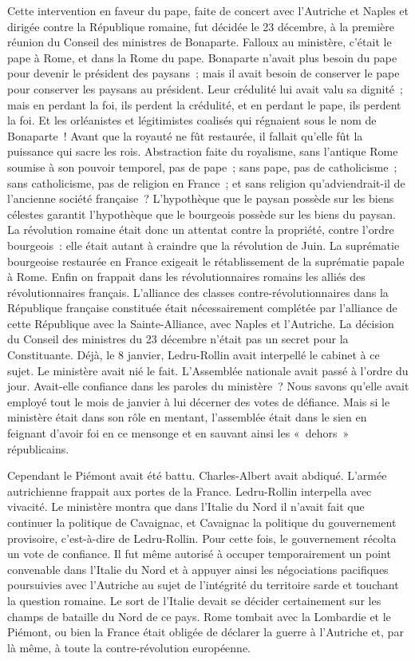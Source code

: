 \documentclass[twoside]{book} %
\begin{document}
Cette intervention en faveur du pape, faite de concert avec l’Autriche et Naples et dirigée contre la République romaine, fut décidée le 23 décembre, à la première réunion du Conseil des ministres de Bonaparte. Falloux au ministère, c’était le pape à Rome, et dans la Rome du pape. Bonaparte n’avait plus besoin du pape pour devenir le président des paysans ; mais il avait besoin de conserver le pape pour conserver les paysans au président. Leur crédulité lui avait valu sa dignité ; mais en perdant la foi, ils perdent la crédulité, et en perdant le pape, ils perdent la foi. Et les orléanistes et légitimistes coalisés qui régnaient sous le nom de Bonaparte ! Avant que la royauté ne fût restaurée, il fallait qu’elle fût la puissance qui sacre les rois. Abstraction faite du royalisme, sans l’antique Rome soumise à son pouvoir temporel, pas de pape ; sans pape, pas de catholicisme ; sans catholicisme, pas de religion en France ; et sans religion qu’adviendrait-il de l’ancienne société française ? L’hypothèque que le paysan possède sur les biens célestes garantit l’hypothèque que le bourgeois possède sur les biens du paysan. La révolution romaine était donc un attentat contre la propriété, contre l’ordre bourgeois : elle était autant à craindre que la révolution de Juin. La suprématie bourgeoise restaurée en France exigeait le rétablissement de la suprématie papale à Rome. Enfin on frappait dans les révolutionnaires romains les alliés des révolutionnaires français. L’alliance des classes contre-révolutionnaires dans la République française constituée était nécessairement complétée par l’alliance de cette République avec la Sainte-Alliance, avec Naples et l’Autriche. La décision du Conseil des ministres du 23 décembre n’était pas un secret pour la Constituante. Déjà, le 8 janvier, Ledru-Rollin avait interpellé le cabinet à ce sujet. Le ministère avait nié le fait. L’Assemblée nationale avait passé à l’ordre du jour. Avait-elle confiance dans les paroles du ministère ? Nous savons qu’elle avait employé tout le mois de janvier à lui décerner des votes de défiance. Mais si le ministère était dans son rôle en mentant, l’assemblée était dans le sien en feignant d’avoir foi en ce mensonge et en sauvant ainsi les « dehors » républicains.\par
Cependant le Piémont avait été battu. Charles-Albert avait abdiqué. L’armée autrichienne frappait aux portes de la France. Ledru-Rollin interpella avec vivacité. Le ministère montra que dans l’Italie du Nord il n’avait fait que continuer la politique de Cavaignac, et Cavaignac la politique du gouvernement provisoire, c’est-à-dire de Ledru-Rollin. Pour cette fois, le gouvernement récolta un vote de confiance. Il fut même autorisé à occuper temporairement un point convenable dans l’Italie du Nord et à appuyer ainsi les négociations pacifiques poursuivies avec l’Autriche au sujet de l’intégrité du territoire sarde et touchant la question romaine. Le sort de l’Italie devait se décider certainement sur les champs de bataille du Nord de ce pays. Rome tombait avec la Lombardie et le Piémont, ou bien la France était obligée de déclarer la guerre à l’Autriche et, par là même, à toute la contre-révolution européenne.\par
\end{document}
